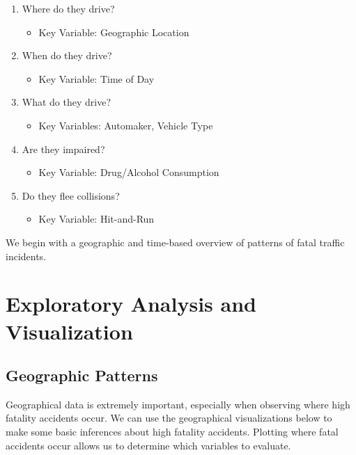 \documentclass[11pt, oneside,titlepage]{article}   	%
\begin{document}
\begin{enumerate}
\item Where do they drive?
\begin{itemize}
\item Key Variable: Geographic Location
\end{itemize}
\item When do they drive?
\begin{itemize}
\item Key Variable: Time of Day
\end{itemize}
\item What do they drive?
\begin{itemize}
\item Key Variables: Automaker, Vehicle Type
\end{itemize}
\item Are they impaired?
\begin{itemize}
\item Key Variable: Drug/Alcohol Consumption
\end{itemize}
\item Do they flee collisions?
\begin{itemize}
\item Key Variable: Hit-and-Run
\end{itemize}
\end{enumerate}

We begin with a geographic and time-based overview of patterns of fatal traffic incidents.

\section*{Exploratory Analysis and Visualization}

\subsection*{Geographic Patterns}

Geographical data is extremely important, especially when observing where high fatality accidents occur. We can use the geographical visualizations below to make some basic inferences about high fatality accidents. Plotting where fatal accidents occur allows us to determine which variables to evaluate.
\end{document}
